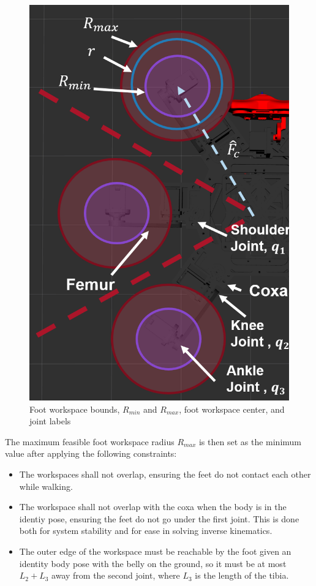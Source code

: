 \begin{figure}[H]
    \centerline{\includegraphics[scale=0.8]{05_methods/figures/labeled_foot_workspace.png}}
    \caption{Foot workspace bounds, $R_{min}$ and $R_{max}$, foot workspace center, and joint labels}
    \label{fig:foot_workspace}
\end{figure}

The maximum feasible foot workspace radius $R_{max}$ is then set as the minimum value after applying the following constraints:

\begin{itemize}
    \item The workspaces shall not overlap, ensuring the feet do not contact each other while walking. 
    \item The workspace shall not overlap with the coxa when the body is in the identiy pose, ensuring the feet do not go under the first joint. This is done both for system stability and for ease in solving inverse kinematics. 
    \item The outer edge of the workspace must be reachable by the foot given an identity body pose with the belly on the ground, so it must be at most $L_2 + L_3$ away from the second joint, where $L_3$ is the length of the tibia. 
\end{itemize}


